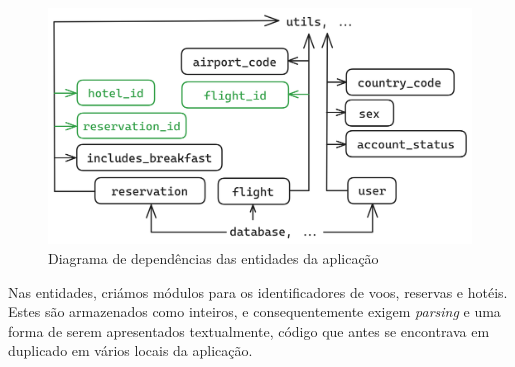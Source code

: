 \documentclass[12pt, a4paper]{article}
\begin{document}
\begin{figure}[ht]
    \centering
    \includegraphics[scale=0.2]{res-fase2/entities.png}
    \caption{Diagrama de dependências das entidades da aplicação}
    \label{fig:parsing}
\end{figure}

Nas entidades, criámos módulos para os identificadores de voos, reservas e hotéis. Estes são
armazenados como inteiros, e consequentemente exigem \emph{parsing} e uma forma de serem
apresentados textualmente, código que antes se encontrava em duplicado em vários locais da
aplicação.
\end{document}
